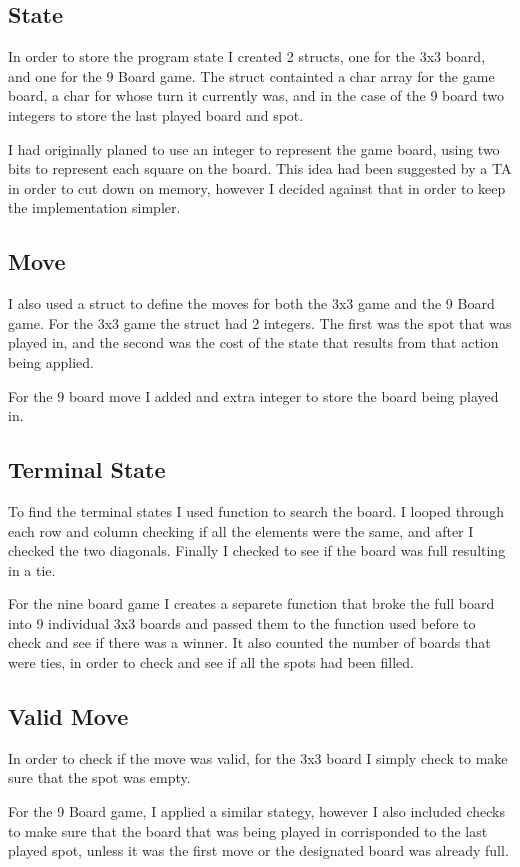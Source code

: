 \documentclass{article}
\begin{document}
\subsection{State}
In order to store the program state I created 2 structs, one for the 3x3 board,
and one for the 9 Board game. The struct containted a char array for the game board,
a char for whose turn it currently was, and in the case of the 9 board two integers
to store the last played board and spot.

I had originally planed to use an integer to represent the game board, using two bits
to represent each square on the board. This idea had been suggested by a TA in order
to cut down on memory, however I decided against that in order to keep the implementation
simpler.

\subsection{Move}
I also used a struct to define the moves for both the 3x3 game and the 9 Board game.
For the 3x3 game the struct had 2 integers. The first was the spot that was played in,
and the second was the cost of the state that results from that action being applied.

For the 9 board move I added and extra integer to store the board being played in.

\subsection{Terminal State}
To find the terminal states I used function to search the board. I looped through
each row and column checking if all the elements were the same, and after I checked
the two diagonals. Finally I checked to see if the board was full resulting in a tie.

For the nine board game I creates a separete function that broke the full board into
9 individual 3x3 boards and passed them to the function used before to check and see
if there was a winner. It also counted the number of boards that were ties, in order
to check and see if all the spots had been filled.

\subsection{Valid Move}
In order to check if the move was valid, for the 3x3 board I simply check to make
sure that the spot was empty.

For the 9 Board game, I applied a similar stategy, however I also included checks to
make sure that the board that was being played in corrisponded to the last played
spot, unless it was the first move or the designated board was already full.
\end{document}
